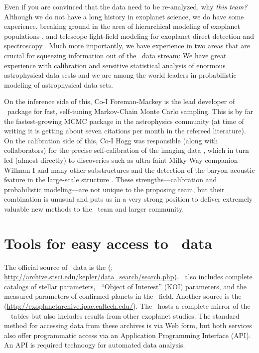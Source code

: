 \documentclass[letterpaper,12pt,preprint]{hack_aastex}
\newcommand{\hurl}[1]{{\scriptsize\url{#1}}}
\newcommand{\emcee}{\package{emcee}}
\begin{document}
Even if you are convinced that the data need to be re-analyzed, why
\emph{this team?}  Although we do not
have a long history in exoplanet science, we do have some experience,
breaking ground in the area of hierarchical modeling of exoplanet
populations \citep{hogg-ecc}, and telescope light-field modeling for
exoplanet direct detection and spectroscopy \citep{opp}.  Much
more importantly, we have experience in two
areas that are crucial for squeezing information out
of the \Kepler\ data stream: We have great experience with calibration
and sensitive statistical analysis of enormous astrophysical data
sests and we are among the world leaders in
probabilistic modeling of astrophysical data sets.

On the inference side of this,
Co-I Foreman-Mackey is the lead developer of \emcee\
package \citep{emcee} for fast, self-tuning Markov-Chain Monte Carlo sampling.
This is by far the fastest-growing MCMC package in the astrophysics community
 (at time of writing it is getting about seven citations per month in the
refereed literature).
On the calibration side of this,
Co-I Hogg was responsible (along with collaborators) for
the precise self-calibration of the 
imaging data \citep{ubercal}, which in turn led (almost directly)
to discoveries such as ultra-faint Milky Way companion Willman I
 \citep{wil1} and many other substructures \citep[for example,][]{wil2, field, gd1} and the detection of the baryon acoustic feature
in the large-scale structure \citep{bao}.  These
strengths---calibration and probabilistic modeling---are not unique to
the proposing team, but their combination is unusual and puts us in a
very strong position to deliver extremely valuable new methods to the
\Kepler\ team and larger community.

\section{Tools for easy access to \Kepler\ data}

The official source of \Kepler\ data is the
(\MAST; \hurl{http://archive.stsci.edu/kepler/data\_search/search.php}).
\MAST\ also includes complete catalogs of stellar parameters, \Kepler\
``Object of Interest'' (KOI) parameters, and the measured parameters of
confirmed planets in the \Kepler\ field.
Another source is the
 (\hurl{http://exoplanetarchive.ipac.caltech.edu/}).
The \EA\ hosts a complete mirror of the \MAST\ \Kepler\ tables but
also includes results from other exoplanet studies.
The standard method for accessing data from these archives is via Web
form,
but both services also offer programmatic access via an Application
Programming Interface (API).
An API is required technoogy for automated data analysis.
\end{document}
